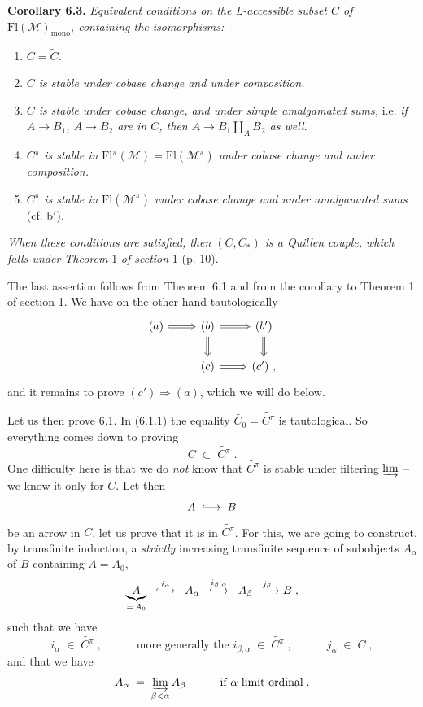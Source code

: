 \documentclass[11pt]{article}
\newcommand{\printedpage}[1]{\marginpar{\footnotesize p.~#1}}
\newcommand{\msp}[1]{\marginpar{\footnotesize [#1]}}
\newcommand{\Fl}{\mathrm{Fl}}
\newcommand{\into}{\lhook\joinrel\longrightarrow}
\begin{document}
\textbf{Corollary 6.3.} \textit{Equivalent conditions on the L-accessible subset $C$ of} $\Fl(\mathcal{M})_{\mathrm{mono}}$\textit{, containing the isomorphisms:}
\begin{enumerate}[label={}]
\item[a)] \textit{$C = \widetilde{C}$.}
\item[b)] \textit{$C$ is stable under cobase change and under composition.}
\item[b$'$)] \textit{$C$ is stable under cobase change, and under simple amalgamated sums,} i.e. \textit{if $A \longrightarrow B_{1}$, $A \longrightarrow B_{2}$ are in $C$, then $A \longrightarrow B_{1} \amalg_{A} B_{2}$ as well.}
\item[c)] \textit{$C^{\pi}$ is stable in} $\Fl^{\pi}(\mathcal{M}) = \Fl(\mathcal{M}^{\pi})$ \textit{under cobase change and under composition.}
\item[c$'$)] \textit{$C^{\pi}$ is stable in} $\Fl(\mathcal{M}^{\pi})$ \textit{under cobase change and under amalgamated sums} (cf. b$'$).
\end{enumerate}
\textit{When these conditions are satisfied, then $(C,C_{*})$ is a Quillen couple, which falls under Theorem} 1 \textit{of section} 1 (p. 10).

The last assertion follows from Theorem 6.1 and from the corollary to Theorem 1 of section 1. We have
\printedpage{43}%
\msp{page 78}
on the other hand tautologically
\[
\begin{tikzcd}
(a) \arrow[r, Rightarrow] & (b) \arrow[r, Rightarrow] \arrow[d, Rightarrow] & (b') \arrow[d, Rightarrow] \\
 & (c) \arrow[r, Rightarrow] & (c') \ ,
\end{tikzcd}
\]
and it remains to prove $(c') \Longrightarrow (a)$, which we will do below.

Let us then prove 6.1. In (6.1.1) the equality $\widetilde{C_{0}} = \widetilde{C^{\pi}}$ is tautological. So everything comes down to proving
\[
C \;\subset\; \widetilde{C^{\pi}} \; .
\]
One difficulty here is that we do \textit{not} know that $\widetilde{C^{\pi}}$ is stable under filtering $\varinjlim$ -- we know it only for $C$. Let then
\[
A \;\into\; B
\]
be an arrow in $C$, let us prove that it is in $\widetilde{C^{\pi}}$. For this, we are going to construct, by transfinite induction, a \textit{strictly} increasing transfinite sequence of subobjects $A_{\alpha}$ of $B$ containing $A = A_{0}$,
\[
\underbrace{A}_{=\,A_{0}} \;\; \overset{i_{\alpha}}{\into} \;\; A_{\alpha} \;\; \overset{i_{\beta,\alpha}}{\into} \;\; A_{\beta} \xrightarrow{\ j_{\beta}\ } B \; ,
\]
such that we have
\[
i_{\alpha} \;\in\; \widetilde{C^{\pi}} \; , \qquad\quad \text{more generally the } i_{\beta,\alpha} \;\in\; \widetilde{C^{\pi}} \; , \qquad\quad j_{\alpha} \;\in\; C \; ,
\]
and that we have
\[
A_{\alpha} \;=\; \varinjlim_{\beta<\alpha} A_{\beta} \qquad\quad \text{if } \alpha \text{ limit ordinal} \; .
\]
\end{document}
